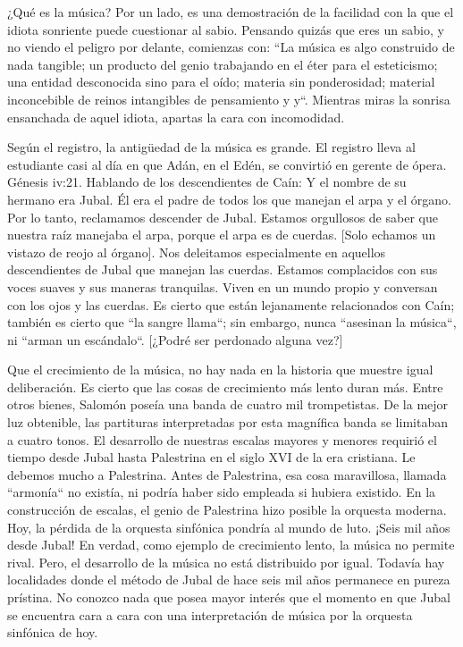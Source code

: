 \documentclass[12pt]{book}
\begin{document}
¿Qué es la música? Por un lado, es una demostración de la facilidad con la que el idiota sonriente puede cuestionar al sabio. Pensando quizás que eres un sabio, y no viendo el peligro por delante, comienzas con: ``La música es algo construido de nada tangible; un producto del genio trabajando en el éter para el esteticismo; una entidad desconocida sino para el oído; materia sin ponderosidad; material inconcebible de reinos intangibles de pensamiento y y``. Mientras miras la sonrisa ensanchada de aquel idiota, apartas la cara con incomodidad.

Según el registro, la antigüedad de la música es grande. El registro lleva al estudiante casi al día en que Adán, en el Edén, se convirtió en gerente de ópera. Génesis iv:21. Hablando de los descendientes de Caín: Y el nombre de su hermano era Jubal. Él era el padre de todos los que manejan el arpa y el órgano.
Por lo tanto, reclamamos descender de Jubal. Estamos orgullosos de saber que nuestra raíz manejaba el arpa, porque el arpa es de cuerdas. [Solo echamos un vistazo de reojo al órgano]. Nos deleitamos especialmente en aquellos descendientes de Jubal que manejan las cuerdas. Estamos complacidos con sus voces suaves y sus maneras tranquilas. Viven en un mundo propio y conversan con los ojos y las cuerdas. Es cierto que están lejanamente relacionados con Caín; también es cierto que ``la sangre llama``; sin embargo, nunca ``asesinan la música``, ni ``arman un escándalo``. [¿Podré ser perdonado alguna vez?]

Que el crecimiento de la música, no hay nada en la historia que muestre igual deliberación. Es cierto que las cosas de crecimiento más lento duran más. Entre otros bienes, Salomón poseía una banda de cuatro mil trompetistas. De la mejor luz obtenible, las partituras interpretadas por esta magnífica banda se limitaban a cuatro tonos. El desarrollo de nuestras escalas mayores y menores requirió el tiempo desde Jubal hasta Palestrina en el siglo XVI de la era cristiana. Le debemos mucho a Palestrina. Antes de Palestrina, esa cosa maravillosa, llamada ``armonía`` no existía, ni podría haber sido empleada si hubiera existido. En la construcción de escalas, el genio de Palestrina hizo posible la orquesta moderna. Hoy, la pérdida de la orquesta sinfónica pondría al mundo de luto. ¡Seis mil años desde Jubal! En verdad, como ejemplo de crecimiento lento, la música no permite rival. Pero, el desarrollo de la música no está distribuido por igual. Todavía hay localidades donde el método de Jubal de hace seis mil años permanece en pureza prístina. No conozco nada que posea mayor interés que el momento en que Jubal se encuentra cara a cara con una interpretación de música por la orquesta sinfónica de hoy.
\end{document}
